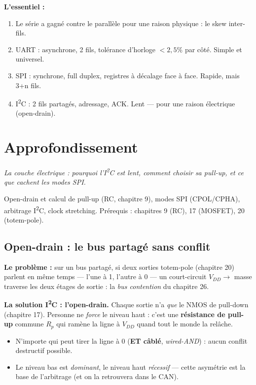 \documentclass[12pt,a4paper,twoside]{book}
\begin{document}
\begin{retenir}
\textbf{L'essentiel :}
\begin{enumerate}[nosep]
\item Le série a gagné contre le parallèle pour une raison physique : le skew inter-fils.
\item UART : asynchrone, 2 fils, tolérance d'horloge $< 2{,}5\%$ par côté. Simple et universel.
\item SPI : synchrone, full duplex, registres à décalage face à face. Rapide, mais 3+n fils.
\item I\textsuperscript{2}C : 2 fils partagés, adressage, ACK. Lent --- pour une raison électrique (open-drain).
\end{enumerate}
\end{retenir}

\section{Approfondissement}

\vspace{0.3cm}
\textit{La couche électrique : pourquoi l'I\textsuperscript{2}C est lent, comment choisir sa pull-up, et ce que cachent les modes SPI.}
\vspace{0.3cm}

\begin{approfondissement}
Open-drain et calcul de pull-up (RC, chapitre 9), modes SPI (CPOL/CPHA), arbitrage I\textsuperscript{2}C, clock stretching. Prérequis : chapitres 9 (RC), 17 (MOSFET), 20 (totem-pole).
\end{approfondissement}

\subsection{Open-drain : le bus partagé sans conflit}

\begin{formule}
\textbf{Le problème :} sur un bus partagé, si deux sorties totem-pole (chapitre 20) parlent en même temps --- l'une à 1, l'autre à 0 --- un court-circuit $V_{DD} \to$ masse traverse les deux étages de sortie : la \textit{bus contention} du chapitre 26.

\textbf{La solution I\textsuperscript{2}C : l'open-drain.} Chaque sortie n'a \textit{que} le NMOS de pull-down (chapitre 17). Personne ne \textit{force} le niveau haut : c'est une \textbf{résistance de pull-up} commune $R_p$ qui ramène la ligne à $V_{DD}$ quand tout le monde la relâche.
\begin{itemize}[nosep]
\item N'importe qui peut tirer la ligne à 0 (\textbf{ET câblé}, \textit{wired-AND}) : aucun conflit destructif possible.
\item Le niveau bas est \textit{dominant}, le niveau haut \textit{récessif} --- cette asymétrie est la base de l'arbitrage (et on la retrouvera dans le CAN).
\end{itemize}
\end{formule}
\end{document}
